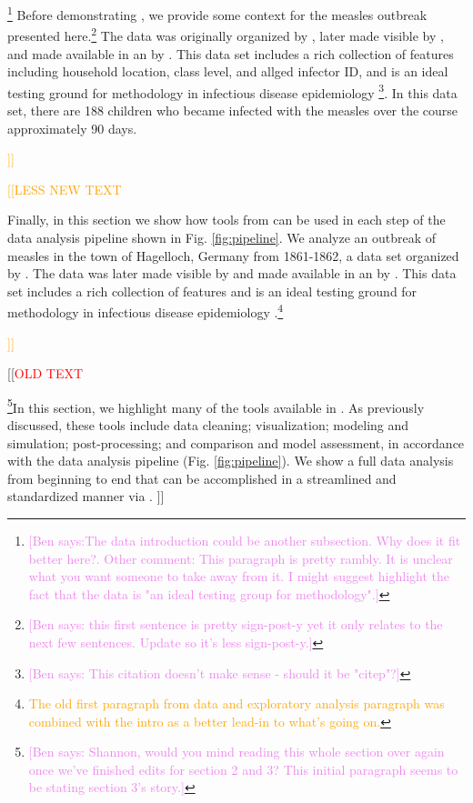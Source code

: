 \documentclass[
  shortnames]{jss}
\begin{document}
\footnote{\textcolor{violet}{[Ben says:The data introduction could be another subsection. Why does it fit better here?.   Other comment: This paragraph is pretty rambly. It is unclear what you want someone to take away from it. I might suggest highlight the fact that the data is "an ideal testing group for methodology".]}}
Before demonstrating , we provide some context for the
measles outbreak presented
here.\footnote{\textcolor{violet}{[Ben says: this first sentence is pretty sign-post-y yet it only relates to the next few sentences. Update so it's less sign-post-y.]}}
The data was originally organized by \cite{pfeilsticker1863}, later made
visible by \cite{oesterle1992}, and made available in an  by
\cite{surveillance2017}. This data set includes a rich collection of
features including household location, class level, and allged infector
ID, and is an ideal testing ground for methodology in infectious disease
epidemiology
\cite{Neal2004,britton2011,groendyke2012,becker2016}\footnote{\textcolor{violet}{[Ben says: This citation doesn't make sense - should it be "citep"?]}}.
In this data set, there are 188 children who became infected with the
measles over the course approximately 90 days.

\textcolor{orange}{]]}

\textcolor{orange}{[[LESS NEW TEXT}

Finally, in this section we show how tools from  can be
used in each step of the data analysis pipeline shown in Fig.
\ref{fig:pipeline}. We analyze an outbreak of measles in the town of
Hagelloch, Germany from 1861-1862, a data set organized by
\cite{pfeilsticker1863}. The data was later made visible by
\cite{oesterle1992} and made available in an  by
\cite{surveillance2017}. This data set includes a rich collection of
features and is an ideal testing ground for methodology in infectious
disease epidemiology
\cite{Neal2004,britton2011,groendyke2012,becker2016}.\footnote{\textcolor{orange}{The old first paragraph from data and exploratory analysis paragraph was combined with the intro as a better lead-in to what's going on.}}

\textcolor{orange}{]]}

{[}{[}\textcolor{red}{OLD TEXT}

\footnote{\textcolor{violet}{[Ben says: Shannon, would you mind reading this whole section over again once we've finished edits for section 2 and 3? This initial paragraph seems to be stating section 3's story.]}}In
this section, we highlight many of the tools available in
. As previously discussed, these tools include data
cleaning; visualization; modeling and simulation; post-processing; and
comparison and model assessment, in accordance with the data analysis
pipeline (Fig. \ref{fig:pipeline}). We show a full data analysis from
beginning to end that can be accomplished in a streamlined and
standardized manner via . {]}{]}
\end{document}
